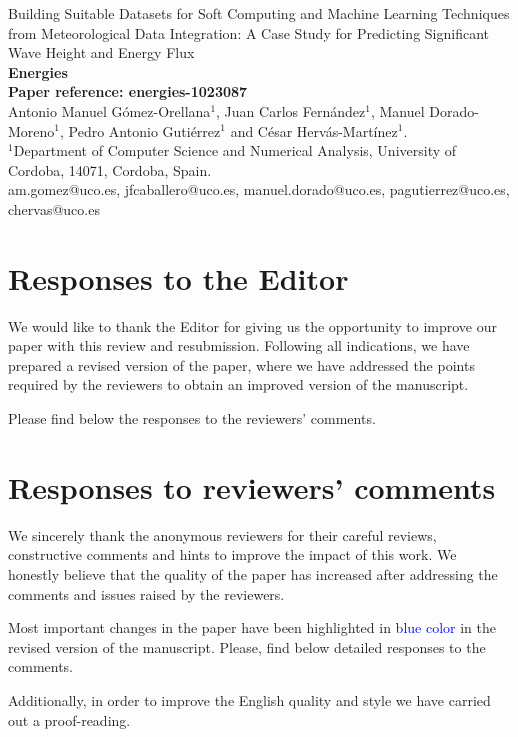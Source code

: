 \documentclass[a4paper,twoside,11pt]{article}
\makeatletter
\newcommand{\myAuthors}{Antonio Manuel Gómez-Orellana$^1$, Juan Carlos Fernández$^1$, Manuel Dorado-Moreno$^1$, Pedro Antonio Gutiérrez$^1$ and César Hervás-Martínez$^1$.}
\newcommand{\myEmail}{\Letter \quad  am.gomez@uco.es, jfcaballero@uco.es, manuel.dorado@uco.es, pagutierrez@uco.es, chervas@uco.es}
\newcommand{\myTitle}{Building Suitable Datasets for Soft Computing and Machine Learning Techniques from Meteorological Data Integration: A Case Study for Predicting Significant Wave Height and Energy Flux}
\newcommand{\myJournal}{\textbf{Energies}}
\newcommand{\myRefPaper}{\textbf{Paper reference: energies-1023087}}
\newcommand{\myDepartament}{$^1$Department of Computer Science and Numerical Analysis, University of Cordoba, 14071, Cordoba, Spain.}
\newcounter{comments}[section]
\makeatother
\begin{document}
\thispagestyle{plain}

\begin{center}
	{\LARGE\myTitle} \vspace{0.5cm} \\
	{\LARGE\myJournal} \vspace{0.5cm} \\
	{\Large\myRefPaper} \vspace{0.5cm} \\
	\myAuthors \vspace{0.5cm} \\
	{\myDepartament} \vspace{0.5cm} \\
	{\myEmail}
\end{center}

\tableofcontents

\section{Responses to the Editor}
We would like to thank the Editor for giving us the opportunity to improve our paper with this review and resubmission. Following all indications, we have prepared a revised version of the paper, where we have addressed the points required by the reviewers to obtain an improved version of the manuscript.


Please find below the responses to the reviewers' comments.

\section{Responses to reviewers' comments}
We sincerely thank the anonymous reviewers for their careful reviews, constructive comments and hints to improve the impact of this work. We honestly believe that the quality of the paper has increased after addressing the comments and issues raised by the reviewers. 

Most important changes in the paper have been highlighted in \textcolor{blue}{blue color} in the revised version of the manuscript. Please, find below detailed responses to the comments.

Additionally, in order to improve the English quality and style we have carried out a proof-reading.
\end{document}
